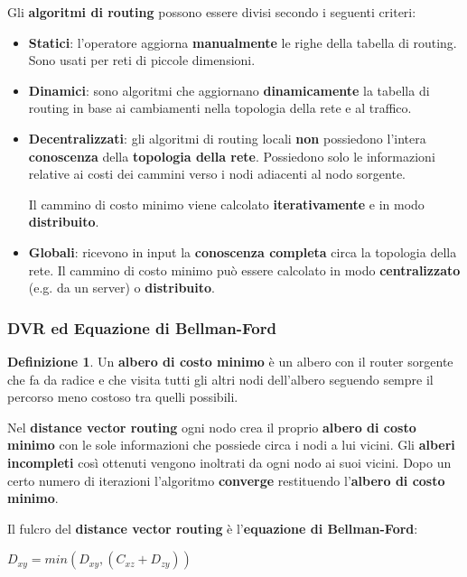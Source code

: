 \documentclass[11pt,a4paper,oneside]{book}
\theoremstyle{definition}
\newtheorem{definition}{Definizione}[section]
\begin{document}
Gli \textbf{algoritmi di routing} possono essere divisi secondo i seguenti criteri:
\begin{itemize}
	\item \textbf{Statici}: l'operatore aggiorna \textbf{manualmente} le righe della tabella di routing. Sono usati per reti di piccole dimensioni.
	\item \textbf{Dinamici}: sono algoritmi che aggiornano \textbf{dinamicamente} la tabella di routing in base ai cambiamenti nella topologia della rete e al traffico.
	\item \textbf{Decentralizzati}: gli algoritmi di routing locali \textbf{non} possiedono l'intera \textbf{conoscenza} della \textbf{topologia della rete}. Possiedono solo le informazioni relative ai costi dei cammini verso i nodi adiacenti al nodo sorgente.

	      \pagebreak

	      Il cammino di costo minimo viene calcolato \textbf{iterativamente} e in modo \textbf{distribuito}.
	\item \textbf{Globali}: ricevono in input la \textbf{conoscenza completa} circa la topologia della rete. Il cammino di costo minimo può essere calcolato in modo \textbf{centralizzato} (e.g. da un server) o \textbf{distribuito}.
\end{itemize}

\subsubsection{DVR ed Equazione di Bellman-Ford}

\theoremstyle{definition}
\begin{definition}
	Un \textbf{albero di costo minimo} è un albero con il router sorgente che fa da radice e che visita tutti gli altri nodi dell'albero seguendo sempre il percorso meno costoso tra quelli possibili.
\end{definition}

Nel \textbf{distance vector routing} ogni nodo crea il proprio \textbf{albero di costo minimo} con le sole informazioni che possiede circa i nodi a lui vicini. Gli \textbf{alberi incompleti} così ottenuti vengono inoltrati da ogni nodo ai suoi vicini. Dopo un certo numero di iterazioni l'algoritmo \textbf{converge} restituendo l'\textbf{albero di costo minimo}.

Il fulcro del \textbf{distance vector routing} è l'\textbf{equazione di Bellman-Ford}:

{\centering $ \displaystyle D_{xy} =  min(D_{xy},(C_{xz} + D_{zy}))$ \par }
\end{document}
